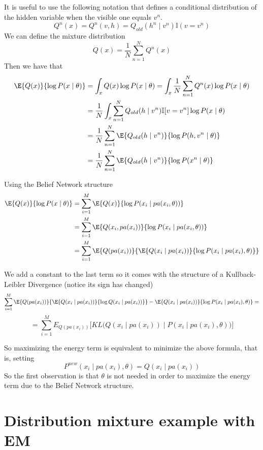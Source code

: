 It is useful to use the following notation that defines a conditional distribution of the hidden variable when the visible one equals \(v^{n}\).
\[
  Q^{n}(x) = Q^{n}(v,h) = Q_{old}(h^{n} \mid v^{n}) \mathbb{I}(v = v^{n})
\]
We can define the mixture distribution
\[
  Q(x) = \frac{1}{N}\sum_{n = 1}^{N}Q^{n}(x)
\]
Then we have that
\[
  \begin{aligned}
    \E{Q(x)}{\log{P(x \mid \theta)}} &= \int_{x}Q(x)\log{P(x \mid \theta)} =  \int_{x} \frac{1}{N}\sum_{n=1}^{N}Q^{n}(x)\log{P(x \mid \theta)} \\
    &= \frac{1}{N} \int_{x}\sum_{n=1}^{N}Q_{old}(h \mid v^{n})\mathbb{I}[v = v^{n}]\log{P(x \mid \theta)}\\
    &= \frac{1}{N}\sum_{n = 1}^{N}\E{Q_{old}(h \mid v^{n})} {\log{P(h, v^{n} \mid \theta)}}\\
    &= \frac{1}{N}\sum_{n = 1}^{N}\E{Q_{old}(h \mid v^{n})} {\log{P(x^{n} \mid \theta)}}
  \end{aligned}
\]

Using the Belief Network structure
\[
  \begin{aligned}
    \E{Q(x)}{\log{P(x \mid \theta)}} &= \sum_{i = 1}^{M}\E{Q(x)}{\log{P(x_{i} \mid pa(x_{i}, \theta))}}\\
    &= \sum_{i = 1}^{M}\E{Q(x_{i}, pa(x_{i}))}{\log{P(x_{i} \mid pa(x_{i}, \theta))}}\\
    &= \sum_{i = 1}^{M}\E{Q(pa(x_{i}))}{ \E{Q(x_{i}\mid pa(x_{i}))}{ \log{P(x_{i} \mid pa(x_{i}), \theta)}}}
\end{aligned}
\]

We add a constant to the last term so it comes with the structure of a Kullback-Leibler Divergence (notice its sign has changed)
\[
  \sum_{i = 1}^{M}\E{Q(pa(x_{i}))}{\E{Q(x_{i}\mid pa(x_{i}))}{\log{Q(x_{i} \mid pa(x_{i}))}}} - \E{Q(x_{i}\mid pa(x_{i}))}{\log{P(x_{i} \mid pa(x_{i}), \theta)}}=
\]
\[
  = \sum_{i = 1}^{M} E_{Q(pa(x_{i}))} \Big[KL \Big( Q(x_{i}\mid pa(x_{i})) \mid P(x_{i} \mid pa(x_{i}), \theta) \Big) \Big]
\]

So maximizing the energy term is equivalent to minimize the above formula, that is, setting
\[
  P^{new}(x_{i} \mid pa(x_{i}), \theta) = Q(x_{i} \mid pa(x_{i}))
\]
So the first observation is that \(\theta\) is not needed in order to maximize the energy term due to the Belief Network structure.

\section{Distribution mixture example with EM}\label{sec:mixture_em}


